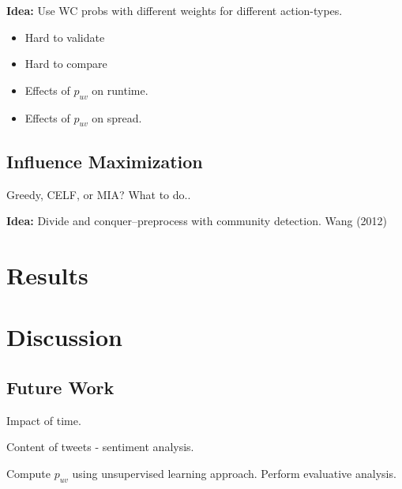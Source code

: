 \documentclass[sigconf]{acmart}
\begin{document}
\textbf{Idea:} Use WC probs with different weights for different action-types. 

\begin{itemize}

\item Hard to validate

\item Hard to compare

\item Effects of $p_{uv}$ on runtime. 

\item Effects of $p_{uv}$ on spread. 

\end{itemize}


\subsection{Influence Maximization}

Greedy, CELF, or MIA? What to do..

\textbf{Idea:} Divide and conquer--preprocess with community detection. Wang (2012)

\section{Results} 

\section{Discussion}

\subsection{Future Work}

Impact of time. 

Content of tweets - sentiment analysis. 

Compute $p_{uv}$ using unsupervised learning approach. Perform evaluative analysis. 

\nocite{*}


\end{document}

